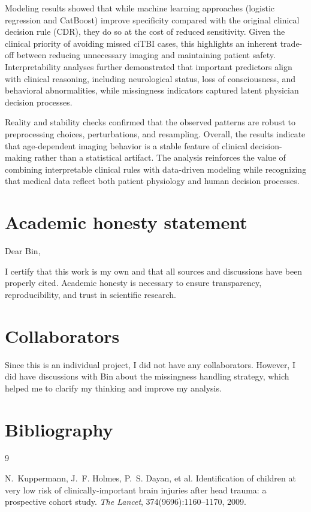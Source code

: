 \documentclass[10pt,letterpaper]{article}
\begin{document}
Modeling results showed that while machine learning approaches (logistic regression and CatBoost) improve specificity compared with the original clinical decision rule (CDR), they do so at the cost of reduced sensitivity. Given the clinical priority of avoiding missed ciTBI cases, this highlights an inherent trade-off between reducing unnecessary imaging and maintaining patient safety. Interpretability analyses further demonstrated that important predictors align with clinical reasoning, including neurological status, loss of consciousness, and behavioral abnormalities, while missingness indicators captured latent physician decision processes.

Reality and stability checks confirmed that the observed patterns are robust to preprocessing choices, perturbations, and resampling. Overall, the results indicate that age-dependent imaging behavior is a stable feature of clinical decision-making rather than a statistical artifact. The analysis reinforces the value of combining interpretable clinical rules with data-driven modeling while recognizing that medical data reflect both patient physiology and human decision processes.

\section{Academic honesty statement}\label{academic-honesty-statement}

Dear Bin,

I certify that this work is my own and that all sources and discussions have been properly cited. Academic honesty is necessary to ensure transparency, reproducibility, and trust in scientific research.

\section{Collaborators}\label{collaborators}
Since this is an individual project, I did not have any collaborators. However, I did have discussions with Bin about the missingness handling strategy, which helped me to clarify my thinking and improve my analysis. 
\renewcommand{\refname}{}
\section{Bibliography}\label{bibliography}

\begin{thebibliography}{9}
\setlength{\itemsep}{0pt}  %

N.~Kuppermann, J.~F. Holmes, P.~S. Dayan, et al.
Identification of children at very low risk of clinically-important brain injuries after head trauma:
a prospective cohort study.
\textit{The Lancet}, 374(9696):1160--1170, 2009.

\end{thebibliography}
\end{document}
